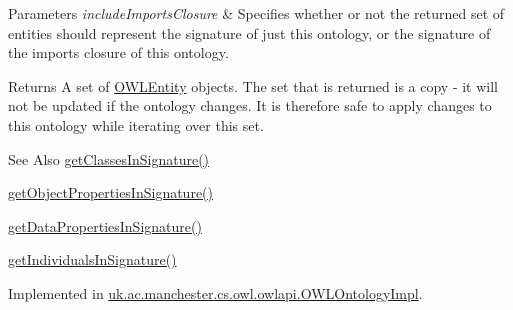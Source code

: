 \begin{DoxyParams}{Parameters}
{\em include\-Imports\-Closure} & Specifies whether or not the returned set of entities should represent the signature of just this ontology, or the signature of the imports closure of this ontology. \\
\hline
\end{DoxyParams}
\begin{DoxyReturn}{Returns}
A set of {\ttfamily \hyperlink{interfaceorg_1_1semanticweb_1_1owlapi_1_1model_1_1_o_w_l_entity}{O\-W\-L\-Entity}} objects. The set that is returned is a copy -\/ it will not be updated if the ontology changes. It is therefore safe to apply changes to this ontology while iterating over this set. 
\end{DoxyReturn}
\begin{DoxySeeAlso}{See Also}
\hyperlink{interfaceorg_1_1semanticweb_1_1owlapi_1_1model_1_1_o_w_l_ontology_a1f6340caef27fd1791a31603940f7549}{get\-Classes\-In\-Signature()} 

\hyperlink{interfaceorg_1_1semanticweb_1_1owlapi_1_1model_1_1_o_w_l_ontology_a63a0131c118a891bbf04411ac37ae66e}{get\-Object\-Properties\-In\-Signature()} 

\hyperlink{interfaceorg_1_1semanticweb_1_1owlapi_1_1model_1_1_o_w_l_ontology_a79cd499333112099749404a7cdc3e1f7}{get\-Data\-Properties\-In\-Signature()} 

\hyperlink{interfaceorg_1_1semanticweb_1_1owlapi_1_1model_1_1_o_w_l_ontology_ac5c78ec9f939f01cc509fba8396177d6}{get\-Individuals\-In\-Signature()} 
\end{DoxySeeAlso}


Implemented in \hyperlink{classuk_1_1ac_1_1manchester_1_1cs_1_1owl_1_1owlapi_1_1_o_w_l_ontology_impl_a9bf758101e0c5d175e80c4bd032f7dfb}{uk.\-ac.\-manchester.\-cs.\-owl.\-owlapi.\-O\-W\-L\-Ontology\-Impl}.

